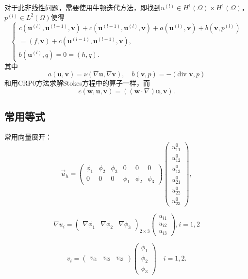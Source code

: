 \documentclass{ctexart}
\begin{document}
对于此非线性问题，需要使用牛顿迭代方法，即找到$u^{(l)} \in H^1(\Omega) \times H^1(\Omega)$，
$p^{(l)} \in L^2(\Omega)$使得
\begin{equation}
    \left\{\begin{matrix}
        c(\mathbf{u}^{(l)}, \mathbf{u}^{(l-1)}, \mathbf{v} ) 
+ c(\mathbf{u}^{(l-1)}, \mathbf{u}^{(l)}, \mathbf{v} ) +
a(\mathbf{u}^{(l)} , \mathbf{v}) 
+  b(\mathbf{v},p^{(l)} )\\
= (f,\mathbf{v}) + c(\mathbf{u}^{(l-1)}, \mathbf{u}^{(l-1)}, \mathbf{v} ),\\ 
        b(\mathbf{u}^{(l)}, q ) = 0 = (h, q) .
\end{matrix}\right.
\end{equation}
其中
$$
a(\mathbf{u,v})=\nu(\nabla \mathbf{u},\nabla \mathbf{v}), 
\quad b(\mathbf{v},p)=-(\text{div } \mathbf{v},p)
$$
和用CRP0方法求解Stokes方程中的算子一样，而
$$
c(\mathbf{w,u,v})= ((\mathbf{w} \cdot \nabla)\mathbf{u}, \mathbf{v}).
$$

\subsection{常用等式}
常用向量展开：
$$
\vec{u}_h = \begin{pmatrix}
    \phi_1&  \phi_2& \phi_3 & 0 & 0 & 0\\
    0 & 0 & 0 & \phi_1 & \phi_2 & \phi_3
  \end{pmatrix} 
  \begin{pmatrix}
   u_{11}^0\\
   u_{12}^0\\
   u_{13}^0\\
   u_{21}^0\\
   u_{22}^0\\
   u_{23}^0
  \end{pmatrix},
$$

$$
\nabla u_i = \begin{pmatrix}
    \nabla \phi_1& \nabla \phi_2 & \nabla \phi_3
  \end{pmatrix}_{2 \times 3}
  \begin{pmatrix}
   u_{i1}\\
   u_{i2}\\
  u_{i3}
  \end{pmatrix},i=1,2
$$

$$
v_i = 
\begin{pmatrix}
  v_{i1}& v_{i2}  & v_{i3}
\end{pmatrix}
\begin{pmatrix}
 \phi _1\\
  \phi _2\\
 \phi _3
\end{pmatrix}
\quad i=1,2.
$$
\end{document}
